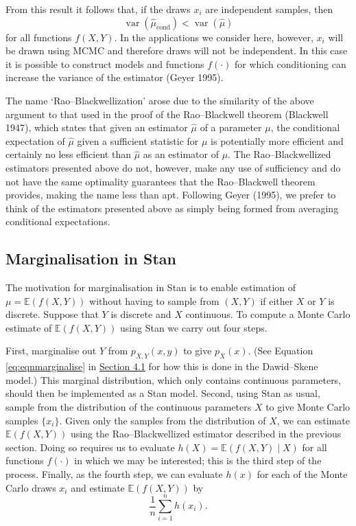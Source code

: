 From this result it follows that, if the draws \(x_i\) are independent
samples, then
\[
\mathop{\mathrm{var}}(\hat{\mu}_{\textrm{cond}}) < \mathop{\mathrm{var}}(\hat{\mu})
\]
for all functions \(f(X, Y)\). In the applications we consider here,
however, \(x_i\) will be drawn using MCMC and therefore draws will not be
independent. In this case it is possible to construct models and
functions \(f(\cdot)\) for which conditioning can increase the variance of
the estimator (Geyer 1995).

The name `Rao--Blackwellization' arose due to the similarity of the
above argument to that used in the proof of the Rao--Blackwell theorem
(Blackwell 1947), which states that given an estimator \(\hat{\mu}\) of a
parameter \(\mu\), the conditional expectation of \(\hat{\mu}\) given a
sufficient statistic for \(\mu\) is potentially more efficient and
certainly no less efficient than \(\hat{\mu}\) as an estimator of \(\mu\).
The Rao--Blackwellized estimators presented above do not, however, make
any use of sufficiency and do not have the same optimality guarantees
that the Rao--Blackwell theorem provides, making the name less than apt.
Following Geyer (1995), we prefer to think of the estimators presented
above as simply being formed from averaging conditional expectations.

\hypertarget{marginalisation-in-stan}{%
\subsection{Marginalisation in Stan}\label{marginalisation-in-stan}}

The motivation for marginalisation in Stan is to enable estimation of
\(\mu = \mathbb{E}(f(X, Y))\) without having to sample from \((X, Y)\) if
either \(X\) or \(Y\) is discrete. Suppose that \(Y\) is discrete and \(X\)
continuous. To compute a Monte Carlo estimate of \(\mathbb{E}(f(X, Y))\)
using Stan we carry out four steps.

First, marginalise out \(Y\) from \(p_{X, Y}(x, y)\) to give \(p_{X}(x)\).
(See Equation \eqref{eq:eqnmarginalise} in \protect\hyperlink{sec:dawid-skene}{Section 4.1} for how this is
done in the Dawid--Skene model.) This marginal distribution, which only
contains continuous parameters, should then be implemented as a Stan
model. Second, using Stan as usual, sample from the distribution of the
continuous parameters \(X\) to give Monte Carlo samples \(\{x_i\}\). Given
only the samples from the distribution of \(X\), we can estimate
\(\mathbb{E}(f(X, Y))\) using the Rao--Blackwellized estimator described
in the previous section. Doing so requires us to evaluate
\(h(X) = \mathbb{E}(f(X, Y) \mid X)\) for all functions \(f(\cdot)\) in
which we may be interested; this is the third step of the process.
Finally, as the fourth step, we can evaluate \(h(x)\) for each of the
Monte Carlo draws \(x_i\) and estimate \(\mathbb{E}(f(X, Y))\) by
\[
\frac{1}{n} \sum_{i = 1}^n h(x_i).
\]

